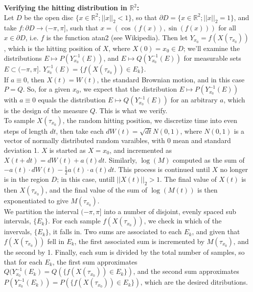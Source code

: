 \documentclass[12pt]{article}
\newcommand{\reals}[0] { \mathbb{R}}
\newcommand{\rarw}[0] { \rightarrow }
\begin{document}
{\bf Verifying the hitting distribution in $\reals^2$:}  \\

Let $D$ be the open disc $\{x \in \reals^2; ||x||_2 < 1 \}$, so that $\partial D = \{ x \in \reals^2; ||x||_2 = 1 \}$, and take $f: \partial D \rarw (-\pi,\pi]$, such that $x = (\cos(f(x)), \sin(f(x)))$ for all $x \in \partial D$, i.e. $f$ is the function atan2 (see Wikipedia). Then let $Y_{x_0} = f(X(\tau_{x_0}))$, which is the hitting position of $X$, where $X(0) = {x_0} \in D$; we'll examine the distributions $E \mapsto P(Y_{x_0}^{-1}(E))$, and $E \mapsto Q(Y_{x_0}^{-1}(E))$ for measurable sets $E \subset (-\pi,\pi]$. $Y_{x_0}^{-1}(E) = \{ f(X(\tau_{x_0})) \in E_k\}$.\\

If $a \equiv 0$, then $X(t) = W(t)$, the standard Brownian motion, and in this case $P = Q$. So, for a given $x_0$, we expect that the distribution $E \mapsto P(Y_{x_0}^{-1}(E))$ with $a \equiv 0$ equals the distribution $E \mapsto Q(Y_{x_0}^{-1}(E))$ for an arbitrary $a$, which is the design of the measure $Q$. This is what we verify. \\

To sample $X(\tau_{x_0})$, the random hitting position, we discretize time into even steps of length $dt$, then take each $dW(t)=\sqrt{dt} N(0,1)$, where $N(0,1)$ is a vector of normally distributed random varaibles, with 0 mean and standard deviation 1. $X$ is started as $X=x_0$, and incremented as $X(t+dt) = dW(t) + a(t)dt$. Similarly, $\log(M)$ computed as the sum of $-a(t) \cdot dW(t) - \frac{1}{2} a(t) \cdot a(t) dt$. This process is continued until $X$ no longer is in the region $D$; in this case, untill $||X(t)||_2 > 1$. The final value of $X(t)$ is then $X(\tau_{x_0})$, and the final value of the sum of $\log(M(t))$ is then exponentiated to give $M(\tau_{x_0})$. \\

We partition the interval $(-\pi,\pi]$ into a number of disjoint, evenly spaced sub intervals, $\{ E_k \}$. For each sample $f(X(\tau_{x_0}))$, we check in which of the invervals, $\{ E_k \}$, it falls in. Two sums are associated to each $E_k$, and given that $f(X(\tau_{x_0}))$ fell in $E_k$, the first associated sum is incremented by $M(\tau_{x_0})$, and the second by 1. Finally, each sum is divided by the total number of samples, so that for each $E_k$, the first sum approximates $Q(Y_{x_0}^{-1}(E_k) = Q(\{ f(X(\tau_{x_0})) \in E_k\})$, and the second sum approximates $P(Y_{x_0}^{-1}(E_k)) = P(\{ f(X(\tau_{x_0})) \in E_k\})$, which are the desired ditributions. \\
\end{document}
